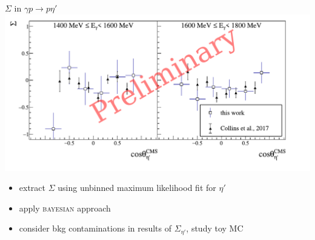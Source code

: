 \documentclass[11pt,aspectratio=169,dvipsnames]{beamer}
\newcommand{\thecolor}{black!70!blue}
\begin{document}
	\begin{frame}{$\Sigma$ in $\gamma p \to p \eta'$}
		\includegraphics[width=\linewidth]{../../DPG2022/figs/sigma.pdf}
	\end{frame}
	\begin{frame}
		\begin{tcolorbox}[colback=blue!5,colframe=\thecolor,title={To Do}]
			\begin{itemize}
				
				\item extract $\Sigma$ using unbinned maximum likelihood fit for $\eta'$
				\item apply \textsc{bayesian} approach 
				\item consider bkg contaminations in results of $\Sigma_{\eta'}$, study toy MC
				
			\end{itemize}
		\end{tcolorbox}
	\end{frame}
	
	
	
	
	
\end{document}
